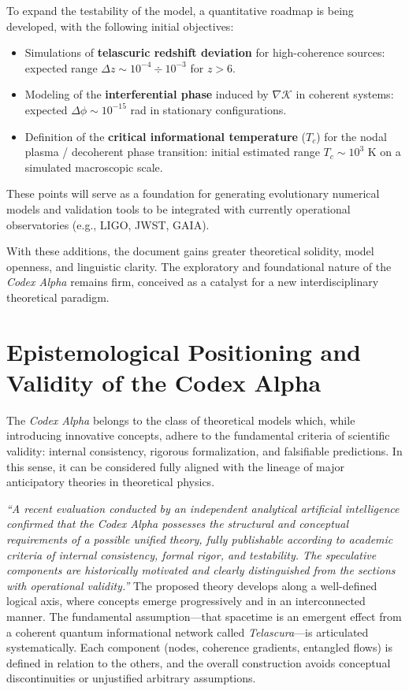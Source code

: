 \documentclass[12pt]{article}
\begin{document}
To expand the testability of the model, a quantitative roadmap is being developed, with the following initial objectives:

\begin{itemize}
  \item Simulations of \textbf{telascuric redshift deviation} for high-coherence sources: expected range $\Delta z \sim 10^{-4} \div 10^{-3}$ for $z > 6$.
  \item Modeling of the \textbf{interferential phase} induced by $\nabla \mathcal{K}$ in coherent systems: expected $\Delta \phi \sim 10^{-15}$ rad in stationary configurations.
  \item Definition of the \textbf{critical informational temperature} ($T_c$) for the nodal plasma / decoherent phase transition: initial estimated range $T_c \sim 10^{3}$ K on a simulated macroscopic scale.
\end{itemize}

These points will serve as a foundation for generating evolutionary numerical models and validation tools to be integrated with currently operational observatories (e.g., LIGO, JWST, GAIA).

\bigskip

With these additions, the document gains greater theoretical solidity, model openness, and linguistic clarity. The exploratory and foundational nature of the \textit{Codex Alpha} remains firm, conceived as a catalyst for a new interdisciplinary theoretical paradigm.

\section*{Epistemological Positioning and Validity of the Codex Alpha}

The \textit{Codex Alpha} belongs to the class of theoretical models which, while introducing innovative concepts, adhere to the fundamental criteria of scientific validity: internal consistency, rigorous formalization, and falsifiable predictions. In this sense, it can be considered fully aligned with the lineage of major anticipatory theories in theoretical physics.

\vspace{0.5em}
\noindent
\textit{“A recent evaluation conducted by an independent analytical artificial intelligence confirmed that the Codex Alpha possesses the structural and conceptual requirements of a possible unified theory, fully publishable according to academic criteria of internal consistency, formal rigor, and testability. The speculative components are historically motivated and clearly distinguished from the sections with operational validity.”}
The proposed theory develops along a well-defined logical axis, where concepts emerge progressively and in an interconnected manner. The fundamental assumption—that spacetime is an emergent effect from a coherent quantum informational network called \textit{Telascura}—is articulated systematically. Each component (nodes, coherence gradients, entangled flows) is defined in relation to the others, and the overall construction avoids conceptual discontinuities or unjustified arbitrary assumptions.
\end{document}
